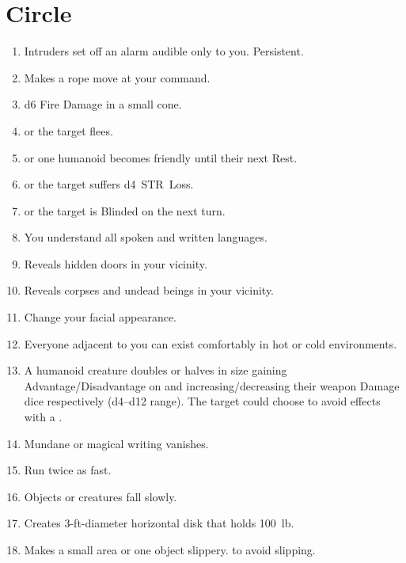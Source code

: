 \documentclass[itdr]{subfiles}
\begin{document}

\vfill
\break

\section{ Circle}
\def \spellcircle {1}
\begin{enumerate}
	\item {} Intruders set off an alarm audible only to you. Persistent.
	\item {} Makes a rope move at your command.
	\item {} d6 Fire Damage in a small cone.
	\item {}  or the target flees.
	\item {}  or one humanoid becomes friendly until their next Rest.
	\item {}  or the target suffers d4~STR~Loss.
	\item {}  or the target is Blinded on the next turn.
	\item {} You understand all spoken and written languages.
	\item {} Reveals hidden doors in your vicinity.
	\item {} Reveals corpses and undead beings in your vicinity.
	\item {} Change your facial appearance.
	\item {} Everyone adjacent to you can exist comfortably in hot or cold environments.
	\item {} A humanoid creature doubles or halves in size gaining Advantage/Disadvantage on  and increasing/decreasing their weapon Damage dice respectively (d4--d12 range). The target could choose to avoid effects with a .
	\item {} Mundane or magical writing vanishes.
	\item {} Run twice as fast.
	\item {} Objects or creatures fall slowly.
	\item {} Creates 3-ft-diameter horizontal disk that holds 100~lb.
	\item {} Makes a small area or one object slippery.  to avoid slipping.

\end{enumerate}
\end{document}
